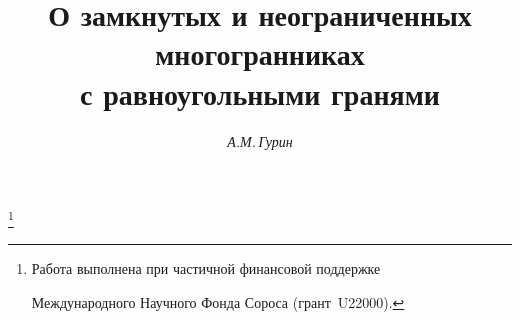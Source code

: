 

 


%  


 


\newcommand{\tts}[1]{} 


 




 


\setcounter{page}{12} 












\author{\it А.М.\,Гурин} 




\title{О замкнутых и неограниченных многогранниках \\ 


с равноугольными гранями} 


\thanks{ 


Работа выполнена при частичной финансовой поддержке 


Международного Научного Фонда Сороса (грант \No\,U22000).} 


 


\date{} 




\pagestyle{plain} %


 




\maketitle 


